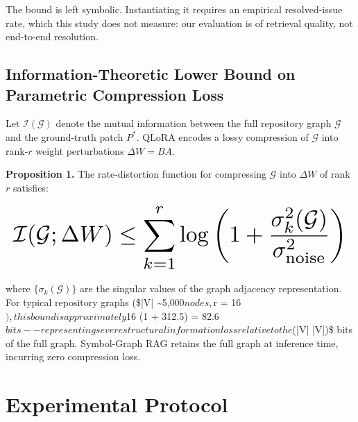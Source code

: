\documentclass[10pt,journal,compsoc,twocolumn]{IEEEtran}
\begin{document}
The bound is left symbolic. Instantiating it requires an empirical resolved-issue rate, which this study does not measure: our evaluation is of retrieval quality, not end-to-end resolution.


\subsection{Information-Theoretic Lower Bound on Parametric Compression Loss}


Let $\mathcal{I}(\mathcal{G})$ denote the mutual information between the full repository graph $\mathcal{G}$ and the ground-truth patch $P^*$. QLoRA encodes a lossy compression of $\mathcal{G}$ into rank-$r$ weight perturbations $\Delta W = BA$.

\textbf{Proposition 1.} The rate-distortion function for compressing $\mathcal{G}$ into $\Delta W$ of rank $r$ satisfies:














\begin{equation}
\resizebox{\columnwidth}{!}{$\displaystyle
\begin{aligned}
\mathcal{I}(\mathcal{G}; \Delta W) \leq \sum_{k=1}^{r} \log\left(1 + \frac{\sigma_k^2(\mathcal{G})}{\sigma_{\text{noise}}^2}\right)
\end{aligned}
$}
\end{equation}














where $\{\sigma_k(\mathcal{G})\}$ are the singular values of the graph adjacency representation. For typical repository graphs (\$|V| \sim 5{,}000$ nodes, $r = 16$), this bound is approximately $16 \times \log(1 + 312.5) = 82.6$ bits -- representing severe structural information loss relative to the $(|V| \log |V|)\$ bits of the full graph. Symbol-Graph RAG retains the full graph at inference time, incurring zero compression loss.




\section{Experimental Protocol}
\end{document}

